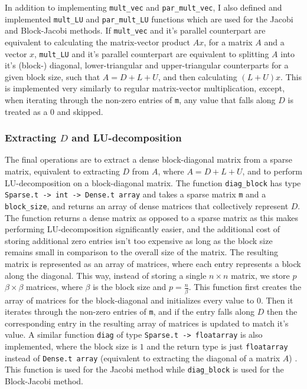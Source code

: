\documentclass[pageno]{jpaper}
\begin{document}
\begin{doublespacing}
In addition to implementing \verb|mult_vec| and \verb|par_mult_vec|, I also defined and implemented \verb|mult_LU| and \verb|par_mult_LU| functions which are used for the Jacobi and Block-Jacobi methods. If \verb|mult_vec| and it's parallel counterpart are equivalent to calculating the matrix-vector product $Ax$, for a matrix $A$ and a vector $x$, \verb|mult_LU| and it's parallel counterpart are equivalent to splitting $A$ into it's (block-) diagonal, lower-triangular and upper-triangular counterparts for a given block size, such that $A = D + L + U$, and then calculating $(L + U)x$. This is implemented very similarly to regular matrix-vector multiplication, except, when iterating through the non-zero entries of \verb|m|, any value that falls along $D$ is treated as a $0$ and skipped.

\subsubsection{Extracting $D$ and LU-decomposition}
The final operations are to extract a dense block-diagonal matrix from a sparse matrix, equivalent to extracting $D$ from $A$, where $A = D + L + U$, and to perform LU-decomposition on a block-diagonal matrix. The function \verb|diag_block| has type \verb|Sparse.t -> int -> Dense.t array| and takes a sparse matrix \verb|m| and a \verb|block_size|, and returns an array of dense matrices that collectively represent $D$. The function returns a dense matrix as opposed to a sparse matrix as this makes performing LU-decomposition significantly easier, and the additional cost of storing additional zero entries isn't too expensive as long as the block size remains small in comparison to the overall size of the matrix. The resulting matrix is represented as an array of matrices, where each entry represents a block along the diagonal. This way, instead of storing a single $n \times n$ matrix, we store $p$ $\beta \times \beta$ matrices, where $\beta$ is the block size and $p = \frac{n}{\beta}$. This function first creates the array of matrices for the block-diagonal and initializes every value to $0$. Then it iterates through the non-zero entries of \verb|m|, and if the entry falls along $D$ then the corresponding entry in the resulting array of matrices is updated to match it's value. A similar function \verb|diag| of type \verb|Sparse.t -> floatarray| is also implemented, where the block size is $1$ and the return type is just \verb|floatarray| instead of \verb|Dense.t array| (equivalent to extracting the diagonal of a matrix $A$) . This function is used for the Jacobi method while \verb|diag_block| is used for the Block-Jacobi method.


\end{doublespacing}
\end{document}

